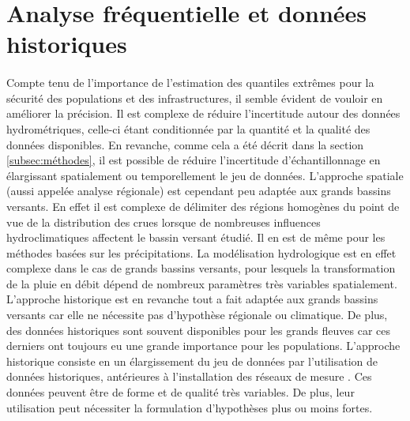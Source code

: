 	\section*{Analyse fréquentielle et données historiques}
	\label{sec:histo}
	
	\paragraph{} Compte tenu de l'importance de l'estimation des quantiles extrêmes pour la sécurité des populations et des infrastructures, il semble évident de vouloir en améliorer la précision. Il est complexe de réduire l'incertitude autour des données hydrométriques, celle-ci étant conditionnée par la quantité et la qualité des données disponibles. En revanche, comme cela a été décrit dans la section \ref{subsec:méthodes}, il est possible de réduire l'incertitude d'échantillonnage en élargissant spatialement ou temporellement le jeu de données. L'approche spatiale (aussi appelée analyse régionale) est cependant peu adaptée aux grands bassins versants. En effet il est complexe de délimiter des régions homogènes du point de vue de la distribution des crues lorsque de nombreuses influences hydroclimatiques affectent le bassin versant étudié. Il en est de même pour les méthodes basées sur les précipitations. La modélisation hydrologique est en effet complexe dans le cas de grands bassins versants, pour lesquels la transformation de la pluie en débit dépend de nombreux paramètres très variables spatialement. L'approche historique est en revanche tout a fait adaptée aux grands bassins versants car elle ne nécessite pas d'hypothèse régionale ou climatique. De plus, des données historiques sont souvent disponibles pour les grands fleuves car ces derniers ont toujours eu une grande importance pour les populations. L'approche historique consiste en un élargissement du jeu de données par l'utilisation de données historiques, antérieures à l'installation des réseaux de mesure \citep{brazdil_historical_2006}. Ces données peuvent être de forme et de qualité très variables. De plus, leur utilisation peut nécessiter la formulation d'hypothèses plus ou moins fortes. 
	
